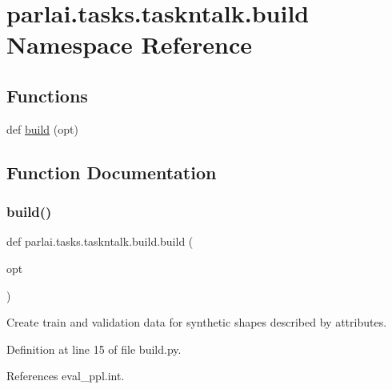 \hypertarget{namespaceparlai_1_1tasks_1_1taskntalk_1_1build}{}\section{parlai.\+tasks.\+taskntalk.\+build Namespace Reference}
\label{namespaceparlai_1_1tasks_1_1taskntalk_1_1build}
\subsection*{Functions}
\begin{DoxyCompactItemize}
\item 
def \hyperlink{namespaceparlai_1_1tasks_1_1taskntalk_1_1build_a92a0de8038feadf9e3980d7ad49f2083}{build} (opt)
\end{DoxyCompactItemize}


\subsection{Function Documentation}
\mbox{\label{namespaceparlai_1_1tasks_1_1taskntalk_1_1build_a92a0de8038feadf9e3980d7ad49f2083}} 
\subsubsection{\texorpdfstring{build()}{build()}}
{\footnotesize\ttfamily def parlai.\+tasks.\+taskntalk.\+build.\+build (\begin{DoxyParamCaption}\item[{}]{opt }\end{DoxyParamCaption})}

\begin{DoxyVerb}Create train and validation data for synthetic shapes described by attributes.\end{DoxyVerb}
 

Definition at line 15 of file build.\+py.



References eval\+\_\+ppl.\+int.

